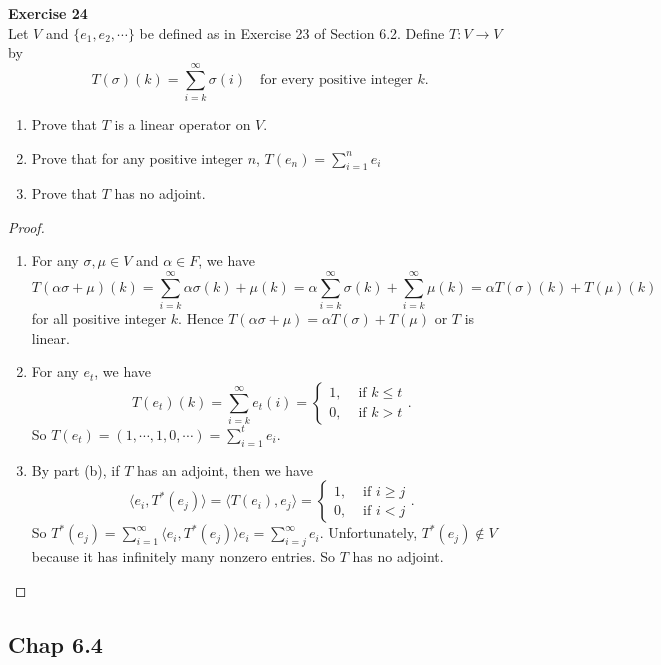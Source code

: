 \documentclass[12pt, a4paper]{article}
\theoremstyle{plain}
\newenvironment{exercise}[2][Exercise]
    { \begin{mdframed}[backgroundcolor=gray!20] \textbf{#1 #2} \\}
    {  \end{mdframed}}
\begin{document}
\begin{exercise}{24}
Let $V$ and $\{e_1,e_2,\cdots\}$ be defined as in Exercise 23 of Section 6.2. Define $T:V\rightarrow V$ by
\[
T(\sigma)(k)=\sum_{i=k}^{\infty}{\sigma(i)}\quad \text{for every positive integer } k.
\]
\begin{enumerate}[label=(\alph*)]
\item Prove that $T$ is a linear operator on $V$.
\item Prove that for any positive integer $n$, $T(e_n)=\sum_{i=1}^{n}{e_i}$
\item Prove that $T$ has no adjoint.
\end{enumerate}
\end{exercise}	
	\begin{proof}
	\hfill
	\begin{enumerate}[label=(\alph*)]
	\item For any $\sigma, \mu\in V$ and $\alpha \in F$, we have 
	\[
	T(\alpha \sigma + \mu)(k) = \sum_{i=k}^{\infty}{\alpha\sigma(k)+\mu(k)} = \alpha\sum_{i=k}^{\infty}{\sigma(k)} + \sum_{i=k}^{\infty}{\mu(k)} = \alpha T(\sigma)(k) + T(\mu)(k)
	\]
	for all positive integer $k$. Hence $T(\alpha \sigma+\mu)=\alpha T(\sigma) + T(\mu)$ or $T$ is linear.
	\item For any $e_t$, we have
	\[
	T(e_t)(k)=\sum_{i=k}^{\infty}{e_t(i)} = \begin{cases}
	1, & \text{ if }k\leq t\\
	0, & \text{ if } k>t
	\end{cases}.
	\]
	So $T(e_t) = (1,\cdots,1,0,\cdots) = \sum_{i=1}^{t}{e_i}$.
	\item By part (b), if $T$ has an adjoint, then we have 
	\[
	\langle{e_i,T^*(e_j)}\rangle=\langle{T(e_i),e_j}\rangle = \begin{cases}
	1, & \text{ if }i\geq j\\
	0, & \text{ if } i<j
	\end{cases}.\]
	So $T^*(e_j) = \sum_{i=1}^{\infty}{\langle{e_i,T^*(e_j)}\rangle e_i} = \sum_{i=j}^{\infty}{e_i}$. Unfortunately, $T^*(e_j)\notin V$ because it has infinitely many nonzero entries. So $T$ has no adjoint.
	\end{enumerate}
	\end{proof}

\subsection*{Chap 6.4}
\end{document}
